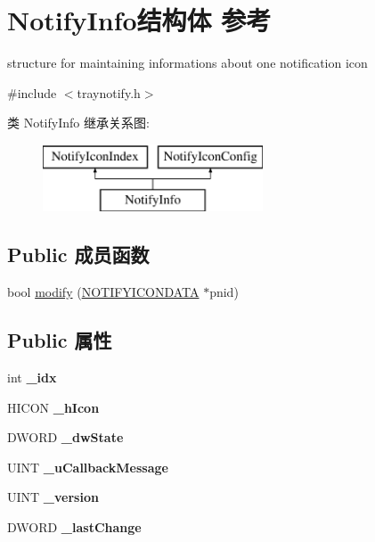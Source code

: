 \hypertarget{struct_notify_info}{}\section{Notify\+Info结构体 参考}
\label{struct_notify_info}


structure for maintaining informations about one notification icon  




{\ttfamily \#include $<$traynotify.\+h$>$}

类 Notify\+Info 继承关系图\+:\begin{figure}[H]
\begin{center}
\leavevmode
\includegraphics[height=2.000000cm]{struct_notify_info}
\end{center}
\end{figure}
\subsection*{Public 成员函数}
\begin{DoxyCompactItemize}
\item 
bool \hyperlink{struct_notify_info_a9dfae22d6f7f370c07ee6d62ba800f83}{modify} (\hyperlink{struct___n_o_t_i_f_y_i_c_o_n_d_a_t_a_a}{N\+O\+T\+I\+F\+Y\+I\+C\+O\+N\+D\+A\+TA} $\ast$pnid)
\end{DoxyCompactItemize}
\subsection*{Public 属性}
\begin{DoxyCompactItemize}
\item 
\mbox{\label{struct_notify_info_ade641ff9afb35baa2244ee412199b1c5}} 
int {\bfseries \+\_\+idx}
\item 
\mbox{\label{struct_notify_info_aea3b9ca1a93970c1cba04af8d4cf52d0}} 
H\+I\+C\+ON {\bfseries \+\_\+h\+Icon}
\item 
\mbox{\label{struct_notify_info_a58dcf2e26f7c85e1b19e2fcf3f3ceaac}} 
D\+W\+O\+RD {\bfseries \+\_\+dw\+State}
\item 
\mbox{\label{struct_notify_info_a43295feeb3cb6559bf22a4675fb335ee}} 
U\+I\+NT {\bfseries \+\_\+u\+Callback\+Message}
\item 
\mbox{\label{struct_notify_info_a6c56ce0d73c58f493994b695ec51da3c}} 
U\+I\+NT {\bfseries \+\_\+version}
\item 
\mbox{\label{struct_notify_info_aa5eb870ae9d0220cf898359dd6a11c51}} 
D\+W\+O\+RD {\bfseries \+\_\+last\+Change}
\end{DoxyCompactItemize}
